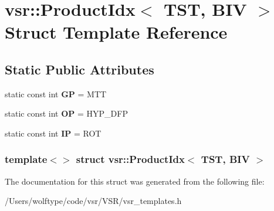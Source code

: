 \hypertarget{structvsr_1_1_product_idx_3_01_t_s_t_00_01_b_i_v_01_4}{\section{vsr\-:\-:Product\-Idx$<$ T\-S\-T, B\-I\-V $>$ Struct Template Reference}
\label{structvsr_1_1_product_idx_3_01_t_s_t_00_01_b_i_v_01_4}
}
\subsection*{Static Public Attributes}
\begin{DoxyCompactItemize}
\item 
\hypertarget{structvsr_1_1_product_idx_3_01_t_s_t_00_01_b_i_v_01_4_a7cacd54b98de066135c792ec13b04c10}{static const int {\bfseries G\-P} = M\-T\-T}\label{structvsr_1_1_product_idx_3_01_t_s_t_00_01_b_i_v_01_4_a7cacd54b98de066135c792ec13b04c10}

\item 
\hypertarget{structvsr_1_1_product_idx_3_01_t_s_t_00_01_b_i_v_01_4_aa9a75dcc74b07a14bf66a22bd590498f}{static const int {\bfseries O\-P} = H\-Y\-P\-\_\-\-D\-F\-P}\label{structvsr_1_1_product_idx_3_01_t_s_t_00_01_b_i_v_01_4_aa9a75dcc74b07a14bf66a22bd590498f}

\item 
\hypertarget{structvsr_1_1_product_idx_3_01_t_s_t_00_01_b_i_v_01_4_a4b854d96fe878cad13bde7db015d10f9}{static const int {\bfseries I\-P} = R\-O\-T}\label{structvsr_1_1_product_idx_3_01_t_s_t_00_01_b_i_v_01_4_a4b854d96fe878cad13bde7db015d10f9}

\end{DoxyCompactItemize}
\subsubsection*{template$<$$>$ struct vsr\-::\-Product\-Idx$<$ T\-S\-T, B\-I\-V $>$}



The documentation for this struct was generated from the following file\-:\begin{DoxyCompactItemize}
\item 
/\-Users/wolftype/code/vsr/\-V\-S\-R/vsr\-\_\-templates.\-h\end{DoxyCompactItemize}
